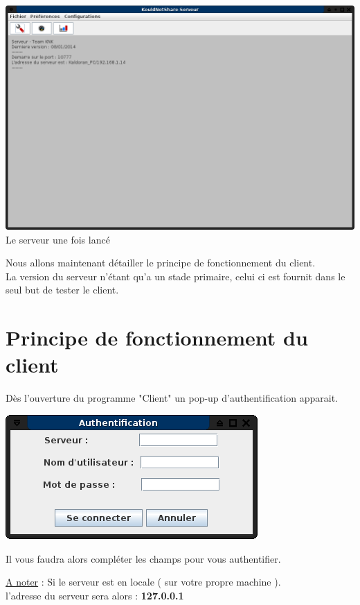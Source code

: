 \documentclass[12pt,a4paper]{article}
\begin{document}
\begin{center}
\includegraphics[scale=0.3]{images/serveurlance.png} \\
Le serveur une fois lancé
\end{center}

Nous allons maintenant détailler le principe de fonctionnement du client. \\
La version du serveur n'étant qu'a un stade primaire, celui ci est fournit dans le seul but de tester le client. \\

\newpage
\section{Principe de fonctionnement du client}

Dès l'ouverture du programme "Client" un pop-up d'authentification apparait.

\begin{center}
\includegraphics[scale=0.5]{images/clientlancelogin.png}
\end{center}

Il vous faudra alors compléter les champs pour vous authentifier.

\underline{A noter} : Si le serveur est en locale ( sur votre propre machine ). \\
l'adresse du serveur sera alors : \textbf{127.0.0.1} \\
\end{document}
